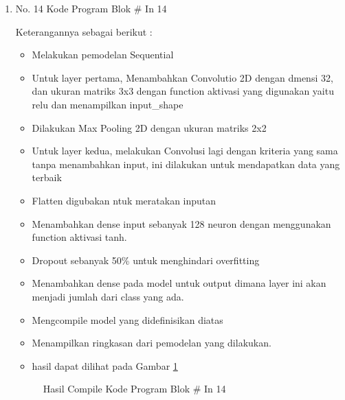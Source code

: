 \begin{enumerate}
\item No. 14 Kode Program Blok \# In 14
\par 
Keterangannya sebagai berikut :
\begin{itemize}
\item Melakukan pemodelan Sequential
\item Untuk layer pertama, Menambahkan Convolutio 2D dengan dmensi 32, dan ukuran matriks 3x3 dengan function aktivasi yang digunakan yaitu relu dan menampilkan input\_shape
\item Dilakukan Max Pooling 2D dengan ukuran matriks 2x2
\item Untuk layer kedua, melakukan Convolusi lagi dengan kriteria yang sama tanpa menambahkan input, ini dilakukan untuk mendapatkan data yang terbaik
\item Flatten digubakan ntuk meratakan inputan
\item Menambahkan dense input sebanyak 128 neuron dengan menggunakan function aktivasi tanh.
\item Dropout sebanyak 50\% untuk menghindari overfitting
\item Menambahkan dense pada model untuk output dimana layer ini akan menjadi jumlah dari class yang ada.
\item Mengcompile model yang didefinisikan diatas
\item Menampilkan ringkasan dari pemodelan yang dilakukan.
\item hasil dapat dilihat pada Gambar \ref{refer25}
\end{itemize}

\begin{figure}[!htbp]
      \caption{Hasil Compile Kode Program Blok \# In 14}
      \label{refer25}
\end{figure}


\end{enumerate}
